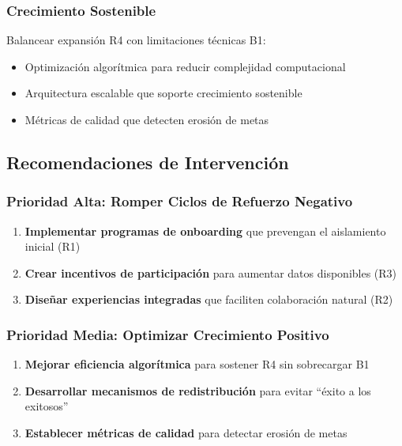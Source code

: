 \documentclass[12pt, letterpaper]{article}
\begin{document}
\subsubsection{Crecimiento Sostenible}

Balancear expansión R4 con limitaciones técnicas B1:

\begin{itemize}
\item Optimización algorítmica para reducir complejidad computacional
\item Arquitectura escalable que soporte crecimiento sostenible
\item Métricas de calidad que detecten erosión de metas
\end{itemize}

\subsection{Recomendaciones de Intervención}

\subsubsection{Prioridad Alta: Romper Ciclos de Refuerzo Negativo}

\begin{enumerate}
\item \textbf{Implementar programas de onboarding} que prevengan el aislamiento inicial (R1)
\item \textbf{Crear incentivos de participación} para aumentar datos disponibles (R3)
\item \textbf{Diseñar experiencias integradas} que faciliten colaboración natural (R2)
\end{enumerate}

\subsubsection{Prioridad Media: Optimizar Crecimiento Positivo}

\begin{enumerate}
\item \textbf{Mejorar eficiencia algorítmica} para sostener R4 sin sobrecargar B1
\item \textbf{Desarrollar mecanismos de redistribución} para evitar ``éxito a los exitosos''
\item \textbf{Establecer métricas de calidad} para detectar erosión de metas
\end{enumerate}
\end{document}
